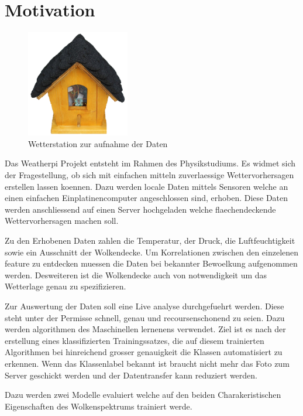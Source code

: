 \section{Motivation}
\label{sec:Motivation}

\begin{figure}
		\centering
		\includegraphics[width=0.4\textwidth]{./pictures/wetterstation.pdf}
		\caption{Wetterstation zur aufnahme der Daten}
		\label{fig:name}
\end{figure}
Das Weatherpi Projekt entsteht im Rahmen des Physikstudiums.
Es widmet sich der Fragestellung, ob sich mit einfachen mitteln zuverlaessige
Wettervorhersagen erstellen lassen koennen.
Dazu werden locale Daten mittels Sensoren welche an einen einfachen Einplatinencomputer
angeschlossen sind, erhoben.
Diese Daten werden anschliessend auf einen Server hochgeladen welche
flaechendeckende Wettervorhersagen machen soll. \par
Zu den Erhobenen Daten zahlen die Temperatur, der Druck, die Luftfeuchtigkeit
sowie ein Ausschnitt der Wolkendecke.
Um Korrelationen zwischen den einzelenen feature zu entdecken muessen die Daten
bei bekannter Bewoelkung aufgenommen werden.
Desweiteren ist die Wolkendecke auch von notwendigkeit um das Wetterlage genau
zu spezifizieren.  \par
Zur Auswertung der Daten soll eine Live analyse durchgefuehrt werden. 
Diese steht unter der Permisse schnell, genau und recoursenschonend zu seien.
Dazu werden algorithmen des Maschinellen lernenens verwendet. 
Ziel ist es nach der erstellung eines klassifizierten Trainingssatzes, die auf
diesem trainierten Algorithmen bei hinreichend grosser genauigkeit die Klassen
automatisiert zu erkennen.
Wenn das Klassenlabel bekannt ist braucht nicht mehr das Foto zum Server
geschickt werden und der Datentransfer kann reduziert werden. \par
Dazu werden zwei Modelle evaluiert welche auf den beiden Charakeristischen
Eigenschaften des Wolkenspektrums trainiert werde. 
